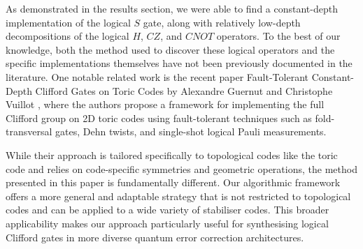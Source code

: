 As demonstrated in the results section, we were able to find a constant-depth implementation of the logical \(S\) gate, along with relatively low-depth decompositions of the logical \(H\), \(CZ\), and \(CNOT\) operators. To the best of our knowledge, both the method used to discover these logical operators and the specific implementations themselves have not been previously documented in the literature. One notable related work is the recent paper Fault-Tolerant Constant-Depth Clifford Gates on Toric Codes by Alexandre Guernut and Christophe Vuillot \cite{guernut2024faulttolerantconstantdepthcliffordgates}, where the authors propose a framework for implementing the full Clifford group on 2D toric codes using fault-tolerant techniques such as fold-transversal gates, Dehn twists, and single-shot logical Pauli measurements.

While their approach is tailored specifically to topological codes like the toric code and relies on code-specific symmetries and geometric operations, the method presented in this paper is fundamentally different. Our algorithmic framework offers a more general and adaptable strategy that is not restricted to topological codes and can be applied to a wide variety of stabiliser codes. This broader applicability makes our approach particularly useful for synthesising logical Clifford gates in more diverse quantum error correction architectures.
